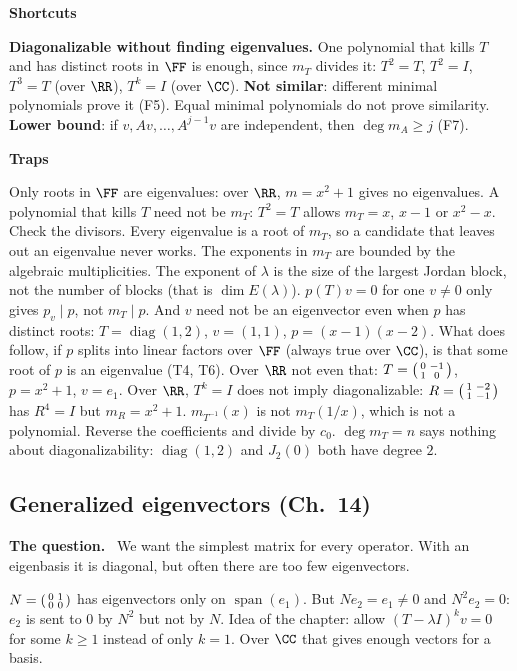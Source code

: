 \documentclass[10pt]{scrartcl}
\DeclareMathOperator{\spn}{span}
\newenvironment{shortcuts}{\begin{mdframed}[style=fastboxstyle]\textbf{\color{NavyBlue}Shortcuts}\begin{itemize}[itemsep=2pt,topsep=2pt]}{\end{itemize}\end{mdframed}}
\newenvironment{qbox}{\begin{mdframed}[style=qboxstyle]\textbf{The question.}\ }{\end{mdframed}}
\newenvironment{trapbox}{\begin{mdframed}[style=trapstyle]\textbf{\color{RawSienna}Traps}\begin{itemize}[itemsep=1pt,topsep=1pt]}{\end{itemize}\end{mdframed}}
\begin{document}
\begin{shortcuts}
  \ii \textbf{Diagonalizable without finding eigenvalues.} One polynomial that kills $T$ and has distinct roots in $\FF$ is enough, since $m_T$ divides it: $T^2=T$, $T^2=I$, $T^3=T$ (over $\RR$), $T^k=I$ (over $\CC$).
  \ii \textbf{Not similar}: different minimal polynomials prove it (F5). Equal minimal polynomials do not prove similarity.
  \ii \textbf{Lower bound}: if $v,Av,\dots,A^{j-1}v$ are independent, then $\deg m_A\ge j$ (F7).
\end{shortcuts}

\begin{trapbox}
  \ii Only roots in $\FF$ are eigenvalues: over $\RR$, $m=x^2+1$ gives no eigenvalues.
  \ii A polynomial that kills $T$ need not be $m_T$: $T^2=T$ allows $m_T=x$, $x-1$ or $x^2-x$. Check the divisors.
  \ii Every eigenvalue is a root of $m_T$, so a candidate that leaves out an eigenvalue never works.
  \ii The exponents in $m_T$ are bounded by the algebraic multiplicities. The exponent of $\lambda$ is the size of the largest Jordan block, not the number of blocks (that is $\dim E(\lambda)$).
  \ii $p(T)v=0$ for one $v\ne0$ only gives $p_v\mid p$, not $m_T\mid p$. And $v$ need not be an eigenvector even when $p$ has distinct roots: $T=\operatorname{diag}(1,2)$, $v=(1,1)$, $p=(x-1)(x-2)$. What does follow, if $p$ splits into linear factors over $\FF$ (always true over $\CC$), is that some root of $p$ is an eigenvalue (T4, T6). Over $\RR$ not even that: $T=\begin{psmallmatrix}0&-1\\1&0\end{psmallmatrix}$, $p=x^2+1$, $v=e_1$.
  \ii Over $\RR$, $T^k=I$ does not imply diagonalizable: $R=\begin{psmallmatrix}1&-2\\1&-1\end{psmallmatrix}$ has $R^4=I$ but $m_R=x^2+1$.
  \ii $m_{T^{-1}}(x)$ is not $m_T(1/x)$, which is not a polynomial. Reverse the coefficients and divide by $c_0$.
  \ii $\deg m_T=n$ says nothing about diagonalizability: $\operatorname{diag}(1,2)$ and $J_2(0)$ both have degree $2$.
\end{trapbox}

\subsection{Generalized eigenvectors (Ch.~14)}

\begin{qbox}
  We want the simplest matrix for every operator. With an eigenbasis it is diagonal, but often there are too few eigenvectors.
  \begin{itemize}
    \ii $N=\begin{psmallmatrix}0&1\\0&0\end{psmallmatrix}$ has eigenvectors only on $\spn(e_1)$.
    \ii But $Ne_2=e_1\ne0$ and $N^2e_2=0$: $e_2$ is sent to $0$ by $N^2$ but not by $N$.
    \ii Idea of the chapter: allow $(T-\lambda I)^kv=0$ for some $k\ge1$ instead of only $k=1$. Over $\CC$ that gives enough vectors for a basis.
  \end{itemize}
\end{qbox}
\end{document}
